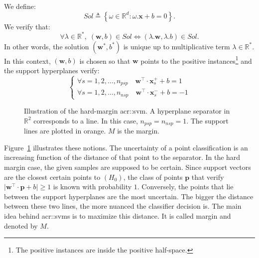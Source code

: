         We define:
        \begin{equation*}
            Sol \triangleq \left\{\omega \in \mathbb{R}^d : \omega.\bm{x} + b = 0\right\}.
        \end{equation*}
        We verify that:
        \begin{equation*}
            \forall \lambda \in \mathbb{R}^*, \; (\bm{w}, b) \in  Sol \Leftrightarrow (\lambda . \bm{w}, \lambda.b) \in Sol.
        \end{equation*}
        In other words, the solution $(\bm{w}^*, b^*)$ is unique up to multiplicative term $\lambda \in \mathbb{R}^*$.
        In this context, $(\bm{w}, b)$ is chosen so that \(\bm{w}\) points to the positive instances\footnote{The positive instances are inside the positive half-space.} and the support hyperplanes verify:
        \begin{equation}
            \label{eq::support_lines}
            \begin{cases}
                \forall s = 1, 2, \dots, n_{psp} \quad \bm{w}^\intercal\cdot\bm{x}^+_s + b = 1\\              
                \forall s = 1, 2, \dots, n_{nsp} \quad \bm{w}^\intercal\cdot\bm{x}^-_s + b = -1                
            \end{cases}
        \end{equation}

        \begin{figure}
            \centering
            
            \caption[
                Illustration of the hard-margin \acrshort*{acr::svm}.
            ]{
                \label{fig::linear_separable} 
                Illustration of the hard-margin \gls{acr::svm}.
                A hyperplane separator in $\mathbb{R}^2$ corresponds to a line.
                In this case, $n_{psp} = n_{nsp} = 1$.
                The support lines are plotted in orange.
                $M$ is the margin.
            }
        \end{figure}

        Figure~\ref{fig::linear_separable} illustrates these notions.
        The uncertainty of a point classification is an increasing function of the distance of that point to the separator.
        In the hard margin case, the given samples are supposed to be certain.
        Since support vectors are the closest certain points to $(H_0)$, the class of points $\bm{p}$ that verify $\vert\bm{w}^\intercal\cdot\bm{p} + b\vert \geq 1$ is known with probability $1$.
        Conversely, the points that lie between the support hyperplanes are the most uncertain.
        The bigger the distance between these two lines, the more nuanced the classifier decision is.
        The main idea behind \glspl{acr::svm} is to maximize this distance.
        It is called margin and denoted by $M$.\\

